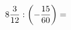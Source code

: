 \documentclass[preview]{standalone}
\begin{document}
\begin{align*}
8 { 3 \over 12 }  :  \left( - { 15 \over 60 } \right)  =
\end{align*}
\end{document}
